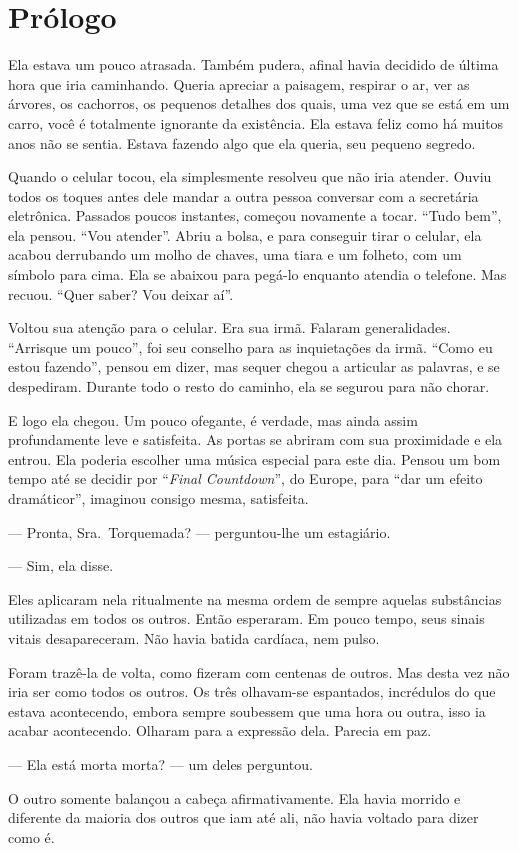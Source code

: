 \chapter*{Prólogo}

Ela estava um pouco atrasada. Também pudera, afinal havia decidido de última hora que iria caminhando. Queria apreciar a paisagem, respirar o ar, ver as árvores, os cachorros, os pequenos detalhes dos quais, uma vez que se está em um carro, você é totalmente ignorante da existência. Ela estava feliz como há muitos anos não se sentia. Estava fazendo algo que ela queria, seu pequeno segredo. 

Quando o celular tocou, ela simplesmente resolveu que não iria atender. Ouviu todos os toques antes dele mandar a outra pessoa conversar com a secretária eletrônica. Passados poucos instantes, começou novamente a tocar. ``Tudo bem'', ela pensou. ``Vou atender''. Abriu a bolsa, e para conseguir tirar o celular, ela acabou derrubando um molho de chaves, uma tiara e um folheto, com um símbolo para cima. Ela se abaixou para pegá-lo enquanto atendia o telefone. Mas recuou. ``Quer saber? Vou deixar aí''.

Voltou sua atenção para o celular. Era sua irmã. Falaram generalidades. ``Arrisque um pouco'', foi seu conselho para as inquietações da irmã. ``Como eu estou fazendo'', pensou em dizer, mas sequer chegou a articular as palavras, e se despediram. Durante todo o resto do caminho, ela se segurou para não chorar.

E logo ela chegou. Um pouco ofegante, é verdade, mas ainda assim profundamente leve e satisfeita. As portas se abriram com sua proximidade e ela entrou. Ela poderia escolher uma música especial para este dia. Pensou um bom tempo até se decidir por ``\foreignlanguage{english}{\emph{Final Countdown}}'', do Europe, para ``dar um efeito dramáticor'', imaginou consigo mesma, satisfeita. 

--- Pronta, Sra.~Torquemada? --- perguntou-lhe um estagiário.

--- Sim, ela disse. 

Eles aplicaram nela ritualmente na mesma ordem de sempre aquelas substâncias utilizadas em todos os outros. Então esperaram. Em pouco tempo, seus sinais vitais desapareceram. Não havia batida cardíaca, nem pulso. 

Foram trazê-la de volta, como fizeram com centenas de outros. Mas desta vez não iria ser como todos os outros. Os três olhavam-se espantados, incrédulos do que estava acontecendo, embora sempre soubessem que uma hora ou outra, isso ia acabar acontecendo. Olharam para a expressão dela. Parecia em paz. 

--- Ela está morta morta? --- um deles perguntou. 

O outro somente balançou a cabeça afirmativamente. Ela havia morrido e diferente da maioria dos outros que iam até ali, não havia voltado para dizer como é. 
